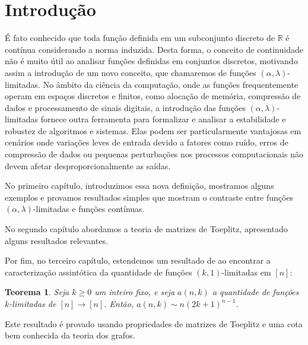 \documentclass[a4paper,12pt]{article}
\newtheorem*{thm}{Teorema}
\theoremstyle{definition}
\begin{document}






\tableofcontents

\newpage

\setcounter{page}{8}
\section*{Introdução}

\vspace{1cm}
\normalsize
É fato conhecido que toda função definida em um subconjunto discreto de $\mathbb{R}$ é contínua considerando a norma induzida. Desta forma, o conceito de continuidade não é muito útil ao analisar funções definidas em conjuntos discretos, motivando assim a introdução de um novo conceito, que chamaremos de funções $(\alpha,\lambda)$-limitadas. No âmbito da ciência da computação, onde as funções frequentemente operam em espaços discretos e finitos, como alocação de memória, compressão de dados e processamento de sinais digitais, a introdução das funções $(\alpha,\lambda)$-limitadas fornece outra ferramenta para formalizar e analisar a estabilidade e robustez de algoritmos e sistemas. Elas podem ser particularmente vantajosas em cenários onde variações leves de entrada devido a fatores como ruído, erros de compressão de dados ou pequenas perturbações nos processos computacionais não devem afetar desproporcionalmente as saídas.

No primeiro capítulo, introduzimos essa nova definição, mostramos alguns exemplos e provamos resultados simples que mostram o contraste entre funções $(\alpha,\lambda)$-limitadas e funções contínuas.

No segundo capítulo abordamos a teoria de matrizes de Toeplitz, apresentado alguns resultados relevantes.

Por fim, no terceiro capítulo, estendemos um resultado de \cite{coulson} ao encontrar a caracterização assintótica da quantidade de funções $(k,1)$-limitadas em $[n]$:

\begin{thm} Seja $k \ge 0$ um inteiro fixo, e seja $a(n, k)$ a quantidade de funções $k$-limitadas de $[n]\to[n]$. Então, $a(n,k) \sim n(2k+1)^{n-1}$. \end{thm}

Este resultado é provado usando propriedades de matrizes de Toeplitz e uma cota bem conhecida da teoria dos grafos.
\end{document}
